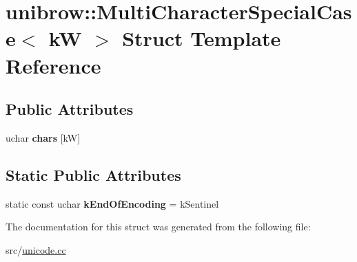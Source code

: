 \hypertarget{structunibrow_1_1_multi_character_special_case}{}\section{unibrow\+:\+:Multi\+Character\+Special\+Case$<$ k\+W $>$ Struct Template Reference}
\label{structunibrow_1_1_multi_character_special_case}
\subsection*{Public Attributes}
\begin{DoxyCompactItemize}
\item 
\hypertarget{structunibrow_1_1_multi_character_special_case_aeaffec07906004ca2756c8e5bb2fe712}{}uchar {\bfseries chars} \mbox{[}k\+W\mbox{]}\label{structunibrow_1_1_multi_character_special_case_aeaffec07906004ca2756c8e5bb2fe712}

\end{DoxyCompactItemize}
\subsection*{Static Public Attributes}
\begin{DoxyCompactItemize}
\item 
\hypertarget{structunibrow_1_1_multi_character_special_case_a71c9c8ec011c227da047061e12109a28}{}static const uchar {\bfseries k\+End\+Of\+Encoding} = k\+Sentinel\label{structunibrow_1_1_multi_character_special_case_a71c9c8ec011c227da047061e12109a28}

\end{DoxyCompactItemize}


The documentation for this struct was generated from the following file\+:\begin{DoxyCompactItemize}
\item 
src/\hyperlink{unicode_8cc}{unicode.\+cc}\end{DoxyCompactItemize}
